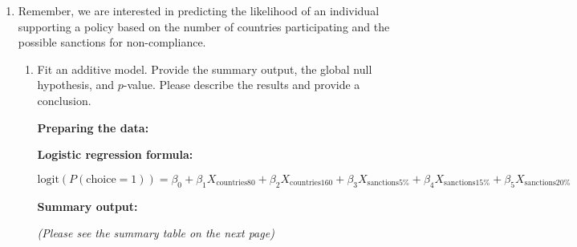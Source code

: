 \documentclass[12pt,letterpaper]{article}
\begin{document}
\begin{enumerate}
	\item
	Remember, we are interested in predicting the likelihood of an individual supporting a policy based on the number of countries participating and the possible sanctions for non-compliance.
	\begin{enumerate}
		\item [] Fit an additive model. Provide the summary output, the global null hypothesis, and $p$-value. Please describe the results and provide a conclusion.

\vspace{.25cm}
\textbf{Preparing the data:}
	 
	
	
\textbf{Logistic regression formula:}

\begin{center}
	$\text{logit}(P(\text{choice}=1)) = \beta_0 + \beta_1 X_{\text{countries80}} + \beta_2 X_{\text{countries160}} + \beta_3 X_{\text{sanctions}5\%} + \beta_4 X_{\text{sanctions}15\%} + \beta_5 X_{\text{sanctions}20\%}$
\end{center}


\textbf{Summary output:}

	 
	
\textit{	(Please see the summary table on the next page)}


\end{enumerate}
\end{enumerate}
\end{document}
